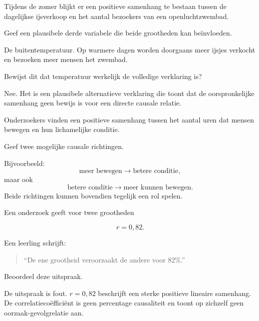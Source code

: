\documentclass{ximera}
\begin{document}
\begin{oefening}{\oefB \ESS}

Tijdens de zomer blijkt er een positieve samenhang te bestaan tussen
de dagelijkse ijsverkoop en het aantal bezoekers van een openluchtzwembad.

\begin{question}
Geef een plausibele derde variabele die beide grootheden kan beïnvloeden.

\begin{oplossing}
De buitentemperatuur. Op warmere dagen worden doorgaans meer ijsjes
verkocht en bezoeken meer mensen het zwembad.
\end{oplossing}
\end{question}

\begin{question}
Bewijst dit dat temperatuur werkelijk de volledige verklaring is?

\begin{oplossing}
Nee. Het is een plausibele alternatieve verklaring die toont dat de
oorspronkelijke samenhang geen bewijs is voor een directe causale
relatie.
\end{oplossing}
\end{question}
\end{oefening}


\begin{oefening}{\oefB \ESS}

Onderzoekers vinden een positieve samenhang tussen het aantal uren dat
mensen bewegen en hun lichamelijke conditie.

Geef twee mogelijke causale richtingen.

\begin{oplossing}
Bijvoorbeeld:
\[
\text{meer bewegen}\longrightarrow\text{betere conditie},
\]
maar ook
\[
\text{betere conditie}\longrightarrow\text{meer kunnen bewegen}.
\]
Beide richtingen kunnen bovendien tegelijk een rol spelen.
\end{oplossing}
\end{oefening}


\begin{oefening}{\oefB \ESS}

Een onderzoek geeft voor twee grootheden

\[
r=0{,}82.
\]

Een leerling schrijft:

\begin{quote}
``De ene grootheid veroorzaakt de andere voor $82\%$.''
\end{quote}

Beoordeel deze uitspraak.

\begin{oplossing}
De uitspraak is fout. $r=0{,}82$ beschrijft een sterke positieve
lineaire samenhang. De correlatiecoëfficiënt is geen percentage
causaliteit en toont op zichzelf geen oorzaak-gevolgrelatie aan.
\end{oplossing}
\end{oefening}
\end{document}

